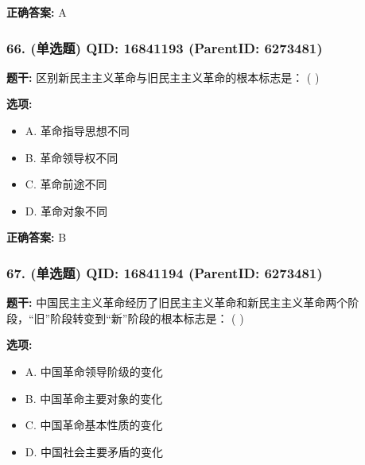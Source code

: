 \documentclass[12pt,UTF8]{ctexart}
\begin{document}
\textbf{正确答案:}
A

\vspace{0.3em}\hrulefill\vspace{0.7em}

\subsubsection*{66. (单选题) \small QID: 16841193 (ParentID: 6273481)}

\textbf{题干:}
区别新民主主义革命与旧民主主义革命的根本标志是： ( )



\textbf{选项:}
\begin{itemize}[leftmargin=*]

  \item A. 革命指导思想不同

  \item B. 革命领导权不同

  \item C. 革命前途不同

  \item D. 革命对象不同

\end{itemize}

\textbf{正确答案:}
B

\vspace{0.3em}\hrulefill\vspace{0.7em}

\subsubsection*{67. (单选题) \small QID: 16841194 (ParentID: 6273481)}

\textbf{题干:}
中国民主主义革命经历了旧民主主义革命和新民主主义革命两个阶段，“旧”阶段转变到“新”阶段的根本标志是： ( )



\textbf{选项:}
\begin{itemize}[leftmargin=*]

  \item A. 中国革命领导阶级的变化

  \item B. 中国革命主要对象的变化

  \item C. 中国革命基本性质的变化

  \item D. 中国社会主要矛盾的变化

\end{itemize}
\end{document}
